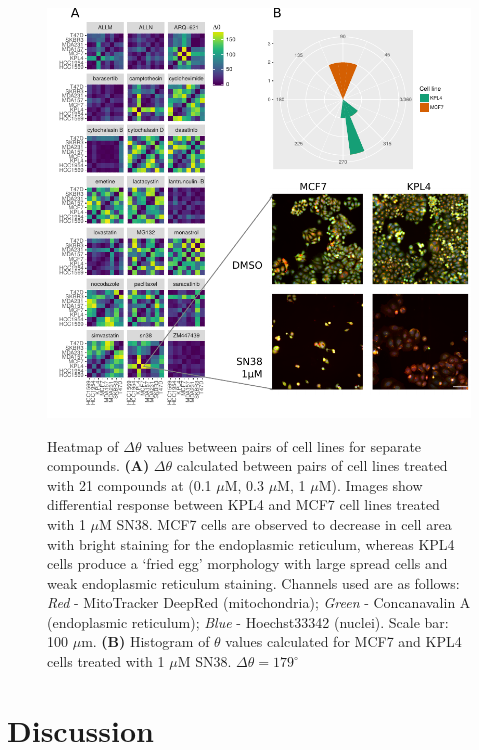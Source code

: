 \documentclass[a4paper,11pt,twoside,openright]{scrbook}
\begin{document}
\begin{figure}
    \captionsetup{width=0.8\textwidth}
    \caption[Heatmap of $\Delta\theta$ between pairs of cell lines for separate compounds]{
Heatmap of $\Delta\theta$ values between pairs of cell lines for separate compounds.
\textbf{(A)} $\Delta\theta$ calculated between pairs of cell lines treated with 21 compounds at (0.1 $\mu$M, 0.3 $\mu$M, 1 $\mu$M).
Images show differential response between KPL4 and MCF7 cell lines treated with 1 $\mu$M SN38.
    MCF7 cells are observed to decrease in cell area with bright staining for the endoplasmic reticulum, whereas KPL4 cells produce a `fried egg' morphology with large spread cells and weak endoplasmic reticulum staining. Channels used are as follows: \textit{Red} - MitoTracker DeepRed (mitochondria); \textit{Green} - Concanavalin A (endoplasmic reticulum); \textit{Blue} - Hoechst33342 (nuclei). Scale bar: 100 $\mu$m.
\textbf{(B)} Histogram of $\theta$ values calculated for MCF7 and KPL4 cells treated with 1 $\mu$M SN38. $\Delta\theta = 179^\circ$
}
    \includegraphics[scale=1.0]{figs/ch3theta24}
    \label{figure:theta_24}
\end{figure}



\section{Discussion}
\end{document}
